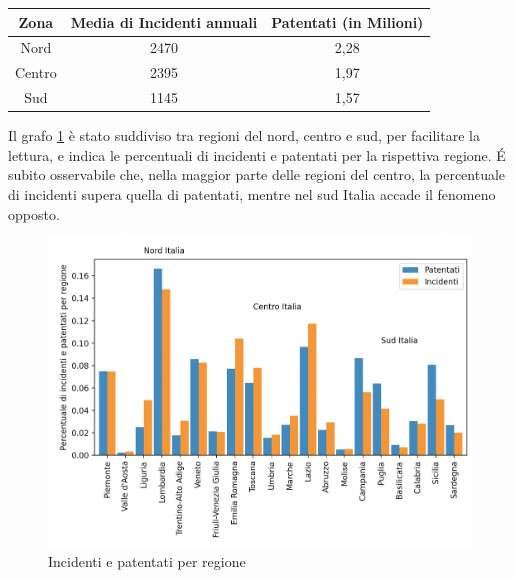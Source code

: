 \documentclass[a4paper]{report}
\begin{document}
\begin{center}
    \def\arraystretch{1.5}%
    \begin{tabular}{ |c|c|c| } 
    \hline
    Zona & Media di Incidenti annuali & Patentati (in Milioni) \\ 
    \hline
    \rowcolor{TableGray}
    Nord & 2470 & 2,28 \\ 
    Centro & 2395 & 1,97 \\ 
    \rowcolor{TableGray}
    Sud & 1145 & 1,57 \\ 
    \hline
    \end{tabular}
\end{center}

Il grafo \ref{fig:incidenti-patentati-bar} è stato suddiviso tra regioni del nord, centro e sud, per facilitare 
la lettura, e indica le percentuali di incidenti e patentati per la rispettiva regione. 
\'E subito osservabile che, nella maggior parte delle regioni del centro, la percentuale di incidenti 
supera quella di patentati, mentre nel sud Italia accade il fenomeno opposto.

\begin{figure}
    \includegraphics[width=\linewidth]{../src/incidenti/incidenti_aci/mappe_regioni/incidenti_patenti_bar.png}
    \caption{Incidenti e patentati per regione}
    \label{fig:incidenti-patentati-bar}
\end{figure}
\end{document}
